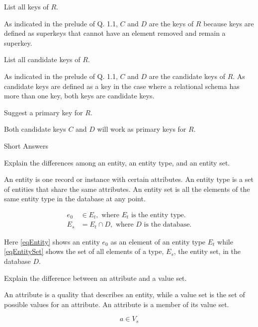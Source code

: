 \documentclass[11pt]{article}
\begin{document}
\begin{question}
\begin{subquestion}
    List all keys of $R$.

    As indicated in the prelude of Q. 1.1, $C$ and $D$ are the keys of $R$ because keys are defined as superkeys that cannot have an element removed and remain a superkey.
\end{subquestion}

\begin{subquestion}
    List all candidate keys of $R$.

    As indicated in the prelude of Q. 1.1, $C$ and $D$ are the candidate keys of $R$. As candidate keys are defined as a key in the case where a relational schema has more than one key, both keys are candidate keys.
\end{subquestion}

\begin{subquestion}
    Suggest a primary key for $R$.

    Both candidate keys $C$ and $D$ will work as primary keys for $R$.
\end{subquestion}

\end{question}

\begin{question}
    Short Answers

\begin{subquestion}
    Explain the differences among an entity, an entity type, and an entity set.

    An entity is one record or instance with certain attributes. An entity type is a set of entities that share the same attributes. An entity set is all the elements of the same entity type in the database at any point.

    \begin{align}
        \label{eqEntity}
        e_0 &\in E_t, \text{ where $E_t$ is the entity type.} \\
        \label{eqEntitySet}
        E_s &= E_t \cap D, \text{ where $D$ is the database.}
    \end{align}

    Here \ref{eqEntity} shows an entity $e_0$ as an element of an entity type $E_t$ while \ref{eqEntitySet} shows the set of all elements of a type, $E_s$, the entity set, in the database $D$.

\end{subquestion}

\begin{subquestion}
    Explain the difference between an attribute and a value set.

    An attribute is a quality that describes an entity, while a value set is the set of possible values for an attribute. An attribute is a member of its value set.

    \begin{equation}
        a \in V_s
    \end{equation}
\end{subquestion}

\end{question}
\end{document}
